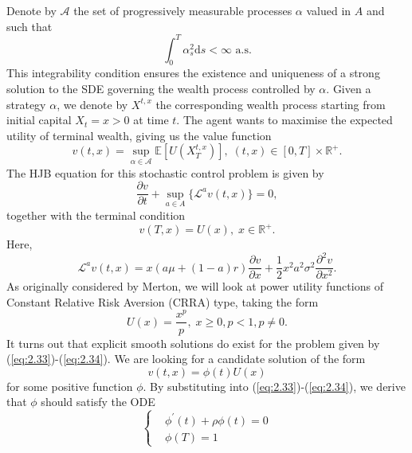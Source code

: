 Denote by $\mathcal{A}$ the set of progressively measurable processes $\alpha$ 
valued in $A$ and such that 
\begin{equation*}
    \int_0^T\alpha_s^2\mathrm ds<\infty\textrm{ a.s.}
\end{equation*}
This integrability condition ensures the existence and uniqueness of a strong solution
to the SDE governing the wealth process controlled by $\alpha$. Given a strategy $\alpha$,
we denote by $X^{t,x}$ the corresponding wealth process starting from initial capital
$X_t=x>0$ at time $t$. The agent wants to maximise the expected utility of terminal wealth,
giving us the value function 
\begin{equation}
    v(t,x)=\sup_{\alpha\in\mathcal{A}}\mathbb{E}[U(X_T^{t,x})],\;(t,x)\in[0,T]\times\mathbb{R}^+.
\end{equation}
The HJB equation for this stochastic control problem is given by 
\begin{equation}\label{eq:2.33}
    \frac{\partial v}{\partial t}+\sup_{a\in A}\{\mathcal{L}^av(t,x)\}=0,
\end{equation}
together with the terminal condition
\begin{equation}\label{eq:2.34}
    v(T,x)=U(x),\;x\in\mathbb{R}^+.
\end{equation}
Here, 
\begin{equation}\label{eq:2.35}
    \mathcal{L}^av(t,x)=x(a\mu+(1-a)r)\frac{\partial v}{\partial x}+\frac{1}{2}x^2a^2\sigma^2\frac{\partial^2 v}{\partial x^2}.
\end{equation}
As originally considered by Merton, we will look at power utility functions of 
Constant Relative Risk Aversion (CRRA) type, taking the form
\begin{equation*}
    U(x)=\frac{x^p}{p},\;x\geq0,p<1,p\neq0.
\end{equation*}
It turns out that explicit smooth solutions do exist for the problem given by 
(\ref{eq:2.33})-(\ref{eq:2.34}). We are looking for a candidate solution of the 
form 
\begin{equation*}
    v(t,x)=\phi(t)U(x)
\end{equation*}
for some positive function $\phi$. By substituting into (\ref{eq:2.33})-(\ref{eq:2.34}),
we derive that $\phi$ should satisfy the ODE
\begin{equation*}
    \left\{
    \begin{aligned}
        &\phi^\prime(t)+\rho\phi(t)=0\\
        &\phi(T)=1
    \end{aligned}
    \right.
\end{equation*}
